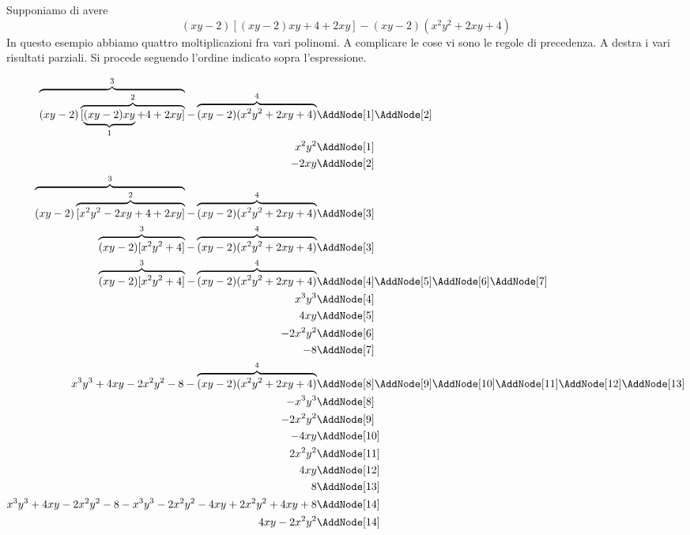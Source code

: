 \begin{esempio}
Supponiamo di avere \[(xy-2)[(xy-2)xy+4+2xy]-(xy-2)(x^2y^2+2xy+4)\]
In questo esempio abbiamo quattro moltiplicazioni  fra vari polinomi. A complicare le cose vi sono le regole di precedenza. A destra i vari risultati parziali. Si procede seguendo l'ordine indicato sopra l'espressione. 
	\begin{NodesList}
		\begin{align*}
			\overbrace{(xy-2)\overbrace{[\underbrace{(xy-2)xy}_{1}+4+2xy]}^{2}}^{3}-\overbrace{(xy-2)(x^2y^2+2xy+4)}^{4} &\AddNode[1]\AddNode[2]\\
			x^2y^2&\AddNode[1]\\ 
			-2xy&\AddNode[2] \\
			\overbrace{(xy-2)\overbrace{[x^2y^2-2xy+4+2xy]}^{2}}^{3}-\overbrace{(xy-2)(x^2y^2+2xy+4)}^{4} &\AddNode[3]\\
			\overbrace{(xy-2)[x^2y^2+4]}^{3}-\overbrace{(xy-2)(x^2y^2+2xy+4)}^{4} &\AddNode[3]\\
			\overbrace{(xy-2)[x^2y^2+4]}^{3}-\overbrace{(xy-2)(x^2y^2+2xy+4)}^{4} &\AddNode[4]\AddNode[5]\AddNode[6]\AddNode[7]\\
			x^3y^3&\AddNode[4]\\    
			4xy&\AddNode[5]\\
			-2x^2y^2&\AddNode[6]\\
			-8&\AddNode[7]\\
			x^3y^3+4xy-2x^2y^2-8-\overbrace{(xy-2)(x^2y^2+2xy+4)}^{4} &\AddNode[8]\AddNode[9]\AddNode[10]\AddNode[11]\AddNode[12]\AddNode[13]\\
			-x^3y^3&\AddNode[8]\\
			-2x^2y^2&\AddNode[9]\\
			-4xy&\AddNode[10]\\   
			2x^2y^2&\AddNode[11] \\ 
			4xy&\AddNode[12]\\     
			8&\AddNode[13]\\   
			x^3y^3+4xy-2x^2y^2-8-x^3y^3-2x^2y^2-4xy+2x^2y^2+4xy+8 &\AddNode[14]\\
			4xy-2x^2y^2 &\AddNode[14]
		\end{align*}
	\end{NodesList}
\end{esempio}
